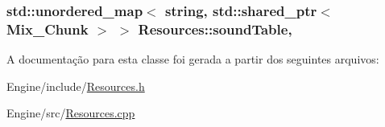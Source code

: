 \hypertarget{classResources_abbd116a3bc870ba6578a89b4aa08908c}{
\subsubsection[{sound\+Table}]{\setlength{\rightskip}{0pt plus 5cm}std\+::unordered\+\_\+map$<$ string, std\+::shared\+\_\+ptr$<$ Mix\+\_\+\+Chunk $>$ $>$ Resources\+::sound\+Table\hspace{0.3cm}{\ttfamily [static]}, {\ttfamily [private]}}}\label{classResources_abbd116a3bc870ba6578a89b4aa08908c}


A documentação para esta classe foi gerada a partir dos seguintes arquivos\+:\begin{DoxyCompactItemize}
\item 
Engine/include/\hyperlink{Resources_8h}{Resources.\+h}\item 
Engine/src/\hyperlink{Resources_8cpp}{Resources.\+cpp}\end{DoxyCompactItemize}
